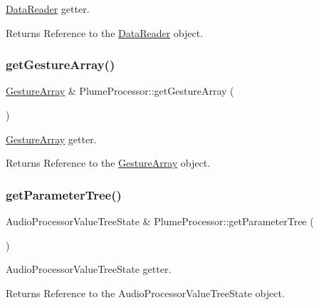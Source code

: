 \mbox{\hyperlink{class_data_reader}{Data\+Reader}} getter. 

\begin{DoxyReturn}{Returns}
Reference to the \mbox{\hyperlink{class_data_reader}{Data\+Reader}} object. 
\end{DoxyReturn}
\mbox{\label{class_plume_processor_a691a2f342167e257fabf74d0bb76a563}} 
\subsubsection{\texorpdfstring{get\+Gesture\+Array()}{getGestureArray()}}
{\footnotesize\ttfamily \mbox{\hyperlink{class_gesture_array}{Gesture\+Array}} \& Plume\+Processor\+::get\+Gesture\+Array (\begin{DoxyParamCaption}{ }\end{DoxyParamCaption})}



\mbox{\hyperlink{class_gesture_array}{Gesture\+Array}} getter. 

\begin{DoxyReturn}{Returns}
Reference to the \mbox{\hyperlink{class_gesture_array}{Gesture\+Array}} object. 
\end{DoxyReturn}
\mbox{\label{class_plume_processor_a644209f6f5ffcd173b09cc897932bba2}} 
\subsubsection{\texorpdfstring{get\+Parameter\+Tree()}{getParameterTree()}}
{\footnotesize\ttfamily Audio\+Processor\+Value\+Tree\+State \& Plume\+Processor\+::get\+Parameter\+Tree (\begin{DoxyParamCaption}{ }\end{DoxyParamCaption})}



Audio\+Processor\+Value\+Tree\+State getter. 

\begin{DoxyReturn}{Returns}
Reference to the Audio\+Processor\+Value\+Tree\+State object. 
\end{DoxyReturn}
\mbox{\label{class_plume_processor_af82034b4fb4b423a61761274d1969f77}} 
